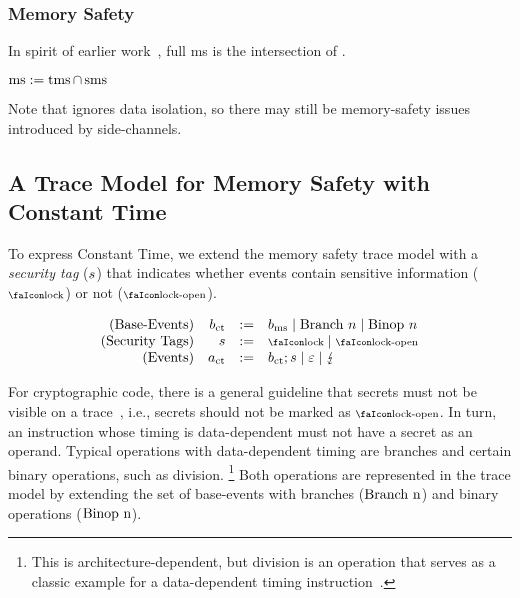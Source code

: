 \subsubsection{Memory Safety}

In spirit of earlier work~\cite{nagarakatte2009soft,nagarakatte2010cets,jim2002cyclone,necula2005ccured,michael2023mswasm}, full \gls*{ms} is the intersection of .

\begin{definition}[\glsfirst*{ms}]\label{def:trace:msdef}
  $
  \operatorname{ms}:=\operatorname{tms} \cap \operatorname{sms}
  $
\end{definition}

Note that  ignores data isolation, so there may still be memory-safety issues introduced by side-channels.

\subsection{A Trace Model for Memory Safety with Constant Time}\label{subsec:scct:tracemodel}

To express Constant Time, we extend the memory safety trace model with a {\em security tag} ($s{}$) that indicates whether events contain sensitive information ($\lock$) or not ($\unlock$).

\vspace{-.5em}
\[
  \begin{array}{rrcl}
    (\text{Base-Events}) & \preevent[_{\ctsafe}] &:=& \preevent[_{\mssafe}] \mid \ev{Branch\ }n \mid \ev{Binop\ }n\\
    (\text{Security Tags}) & \securitytag{} &:=& \lock \mid \unlock\\ 
    (\text{Events}) & \event[_{\ctsafe}] &:=& \preevent[_{\ctsafe}];\securitytag{} \mid \emptyevent \mid \lightning \\ 
  \end{array}
\]

For cryptographic code, there is a general guideline that secrets must not be visible on a trace~\cite{ctguidelines}, i.e., secrets should not be marked as $\unlock$.
In turn, an instruction whose timing is data-dependent must not have a secret as an operand.
Typical operations with data-dependent timing are branches and certain binary operations, such as division.%
\footnote{
	This is architecture-dependent, but division is an operation that serves as a classic example for a data-dependent timing instruction~\cite[p.~755]{arm-refman}.
}
Both operations are represented in the trace model by extending the set of base-events with branches ($\text{Branch\ n}$) and binary operations ($\text{Binop\ n}$).

